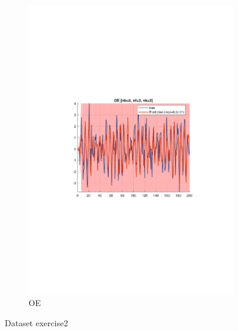 \documentclass[]{article}
\begin{document}
\begin{figure}[ht]
\begin{subfigure}{.49\textwidth}
	\includegraphics[trim= 10cm 8cm 10cm 8cm, scale=0.4]{figures/3-OE-Ex2-idcompare.pdf}
	\caption{OE}
	\label{fig:Ex2-idcompare-OE}
\end{subfigure}
\caption{Dataset exercise2}
\label{fig:Ex2-idcompare}
\end{figure}
\end{document}
